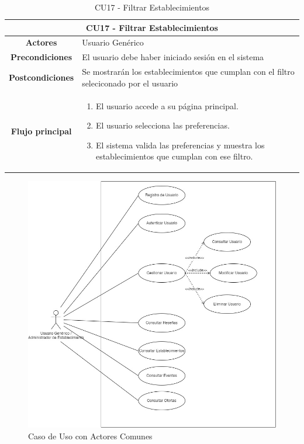\begin{table}[h]
    \centering
    \begin{tabular}{|c|p{10cm}|}
        \hline
        \multicolumn{2}{|c|}{\textbf{CU17 - Filtrar Establecimientos}}                                                                \\
        \hline
        \textbf{Actores}         & Usuario Genérico                                                                                   \\
        \hline
        \textbf{Precondiciones}  & El usuario debe haber iniciado sesión en el sistema                                                \\
        \hline
        \textbf{Postcondiciones} & Se mostrarán los establecimientos que cumplan con el filtro seleciconado por el usuario            \\
        \hline
        \textbf{Flujo principal} & \begin{enumerate}
                                       \item El usuario accede a su página principal.
                                       \item El usuario selecciona las preferencias.
                                       \item El sistema valida las preferencias y muestra los establecimientos que cumplan con ese filtro.
                                   \end{enumerate} \\
        \hline
    \end{tabular}
    \caption{CU17 - Filtrar Establecimientos }
\end{table}

\clearpage
\thispagestyle{empty}
\begin{figure}[H]
    \centering
    \includegraphics[width=\textwidth,height=\textheight,keepaspectratio]{imagenes/CasoDeUsoComun.jpg}
    \caption{Caso de Uso con Actores Comunes}
    \label{fig:CasoDeUsoComun}
\end{figure}

